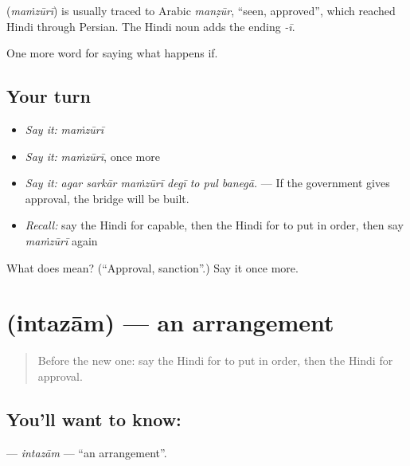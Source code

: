 \begin{cousinweb}
\textbf{} (\emph{maṁzūrī}) is usually traced to Arabic \emph{manẓūr}, \textquotedblleft{}seen, approved\textquotedblright{}, which reached Hindi through Persian. The Hindi noun adds the ending \emph{-ī}.
\end{cousinweb}

\begin{grammarlens}[title={What you've built}]
One more word for saying what happens if.
\end{grammarlens}

\subsection*{Your turn}
\begin{itemize}
\raggedright
  \item \emph{Say it:} \emph{maṁzūrī}
  \item \emph{Say it:} \emph{maṁzūrī}, once more
  \item \emph{Say it:} \emph{agar sarkār maṁzūrī degī to pul banegā.} — If the government gives approval, the bridge will be built.
  \item \emph{Recall:} say the Hindi for capable, then the Hindi for to put in order, then say \emph{maṁzūrī} again
\end{itemize}

\begin{tcolorbox}[breakable,colback=teal!4,colframe=teal!35!black,title={Before you move on}]
What does  mean? (\textquotedblleft{}Approval, sanction\textquotedblright{}.) Say it once more.
\end{tcolorbox}
\section[\texorpdfstring{\hi{इंतज़ाम} (intazām)}{इंतज़ाम (intazām)}]{ (intazām) — an arrangement}

\label{lesson:HI-C395-intazam}



\begin{quote}
Before the new one: say the Hindi for to put in order, then the Hindi for approval.
\end{quote}

\subsection*{You'll want to know: }
\textbf{} — \emph{intazām} — \textquotedblleft{}an arrangement\textquotedblright{}.

